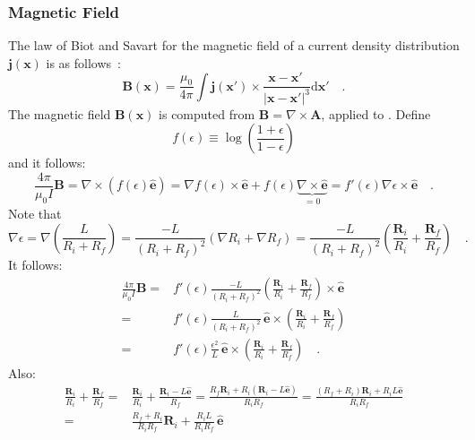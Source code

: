 \subsubsection{Magnetic Field}
The law of Biot and Savart for the magnetic field of a current density distribution $\mathbf{j}(\mathbf{x})$ is as follows~\cite{jackson}:
\begin{equation}
 \mathbf{B}(\mathbf{x}) = \frac{\mu_0}{4 \pi} \int \mathbf{j}(\mathbf{x}') \times \frac{\mathbf{x} - \mathbf{x}'~}{|\mathbf{x} - \mathbf{x}'|^3} \mathrm{d}\mathbf{x}' \quad .
\end{equation}
The magnetic field $\mathbf{B}(\mathbf{x})$ is computed from $\mathbf{B} = \nabla \times \mathbf{A}$, applied to .
Define
\begin{equation}
 f(\epsilon) \equiv \log\left(\frac{1 + \epsilon}{1 - \epsilon} \right)
\end{equation}
and it follows:
\begin{equation}
  \frac{4 \pi}{\mu_0 I} \mathbf{B}
 = \nabla \times \left( f(\epsilon) \hat{\mathbf{e}} \right)
 = \nabla f(\epsilon) \times \hat{\mathbf{e}} + f(\epsilon) \underbrace{\nabla \times \hat{\mathbf{e}}}_{=0}
 = f'(\epsilon) \nabla \epsilon \times \hat{\mathbf{e}} \quad .
\end{equation}
Note that
\begin{equation}
   \nabla \epsilon
 = \nabla \left( \frac{L}{R_i + R_f} \right)
 = \frac{-L}{(R_i + R_f)^2}\left( \nabla R_i + \nabla R_f \right)
 = \frac{-L}{(R_i + R_f)^2}\left( \frac{\mathbf{R}_i}{R_i} + \frac{\mathbf{R}_f}{R_f} \right) \quad .
\end{equation}
It follows:
\begin{align}
   \frac{4 \pi}{\mu_0 I} \mathbf{B}
 = & f'(\epsilon) \frac{-L}{(R_i + R_f)^2} \left( \frac{\mathbf{R}_i}{R_i} + \frac{\mathbf{R}_f}{R_f} \right) \times \hat{\mathbf{e}} \\
 = & f'(\epsilon) \frac{L}{(R_i + R_f)^2} \, \hat{\mathbf{e}} \times \left( \frac{\mathbf{R}_i}{R_i} + \frac{\mathbf{R}_f}{R_f} \right) \\
 = & f'(\epsilon) \frac{\epsilon^2}{L}    \, \hat{\mathbf{e}} \times \left( \frac{\mathbf{R}_i}{R_i} + \frac{\mathbf{R}_f}{R_f} \right) \quad . \label{eqn:B_intermediate}
\end{align}
Also:
\begin{align}
   \frac{\mathbf{R}_i}{R_i} + \frac{\mathbf{R}_f}{R_f}
 = & \frac{\mathbf{R}_i}{R_i} + \frac{\mathbf{R}_i - L \hat{\mathbf{e}} }{R_f}
 =   \frac{R_f \mathbf{R}_i + R_i (\mathbf{R}_i - L \hat{\mathbf{e}}) }{R_i R_f}
 =   \frac{(R_f+R_i) \mathbf{R}_i + R_i L \hat{\mathbf{e}} }{R_i R_f} \\
 = & \frac{R_f+R_i}{R_i R_f} \mathbf{R}_i + \frac{R_i L}{R_i R_f} \, \hat{\mathbf{e}}
\end{align}
